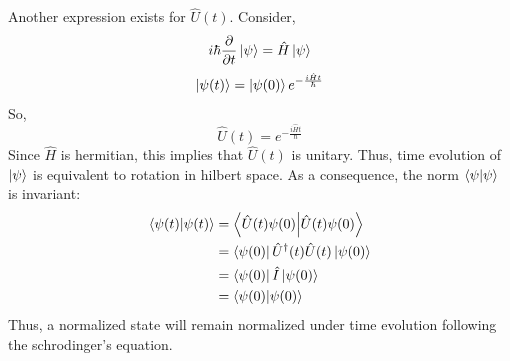 \documentclass[12pt,a4paper]{report}
\newcommand{\parder}[2]{\frac{\partial#1}{\partial#2}}
\begin{document}
Another expression exists for $\hat{U}(t)$. Consider,
\begin{equation*}
    i\hbar \parder{}{t}\ket{\psi} = \hat{H}\ket{\psi}
\end{equation*}
\begin{equation*}
    \ket{\psi(t)} = \ket{\psi(0)} e^{-\frac{i\hat{H}t}{\hbar}}
\end{equation*}
So,
\begin{equation*}
    \hat{U}(t) = e^{-\frac{i\hat{H}t}{\hbar}}
\end{equation*}
Since $\hat{H}$ is hermitian, this implies that $\hat{U}(t)$ is unitary. Thus, time evolution of $\ket{\psi}$ is
equivalent to rotation in hilbert space. As a consequence, the norm $\bra{\psi}\ket{\psi}$ is invariant:
\begin{align*}
    \bra{\psi(t)}\ket{\psi(t)} &= \bra{\hat{U}(t)\psi(0)}\ket{\hat{U}(t)\psi(0)} \\
    &= \bra{\psi(0)}\hat{U}^\dagger(t)\hat{U}(t)\ket{\psi(0)} \\
    &= \bra{\psi(0)}\hat{I}\ket{\psi(0)} \\
    &= \bra{\psi(0)}\ket{\psi(0)} \\
\end{align*}
Thus, a normalized state will remain normalized under time evolution following the schrodinger's equation.
\end{document}

